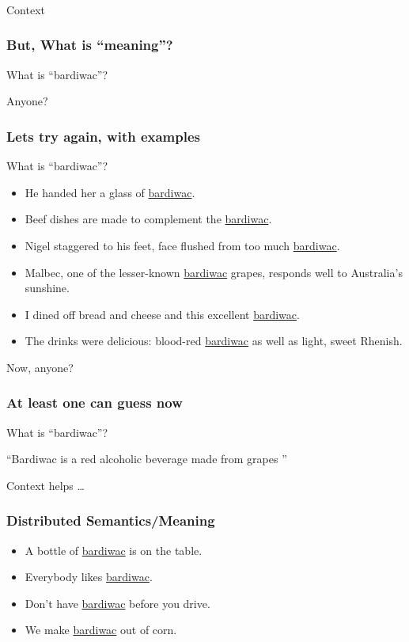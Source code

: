\begin{frame}[fragile]\frametitle{}

\begin{center}
{\Large Context}
\end{center}
\end{frame}


\begin{frame}[fragile]\frametitle{But, What is ``meaning''?}
What is ``bardiwac''?

Anyone?
\end{frame}

\begin{frame}[fragile]\frametitle{Lets try again, with examples}
What is ``bardiwac''?

\begin{itemize}
\item He handed her a glass of \underline{bardiwac}. 
\item Beef dishes are made to complement the \underline{bardiwac}.
\item Nigel staggered to his feet, face flushed from too much
\underline{bardiwac}. 
\item Malbec, one of the lesser-known \underline{bardiwac} grapes,
responds well to Australia’s sunshine. 
\item I dined off bread and cheese and this excellent \underline{bardiwac}. 
\item The drinks were delicious: blood-red \underline{bardiwac} as well as 
light, sweet Rhenish. 
\end{itemize}

Now, anyone?
\end{frame}

\begin{frame}[fragile]\frametitle{At least one can guess now}
What is ``bardiwac''?

``Bardiwac is a red 
alcoholic beverage 
made from grapes ''

Context helps \ldots
\end{frame}

\begin{frame}[fragile]\frametitle{Distributed Semantics/Meaning}
\begin{itemize}
\item  A bottle of \underline{bardiwac} is on the table. 
\item  Everybody likes \underline{bardiwac}.
\item  Don’t have \underline{bardiwac} before you drive. 
\item  We make \underline{bardiwac}  out of corn. 

\end{itemize}
\end{frame}

